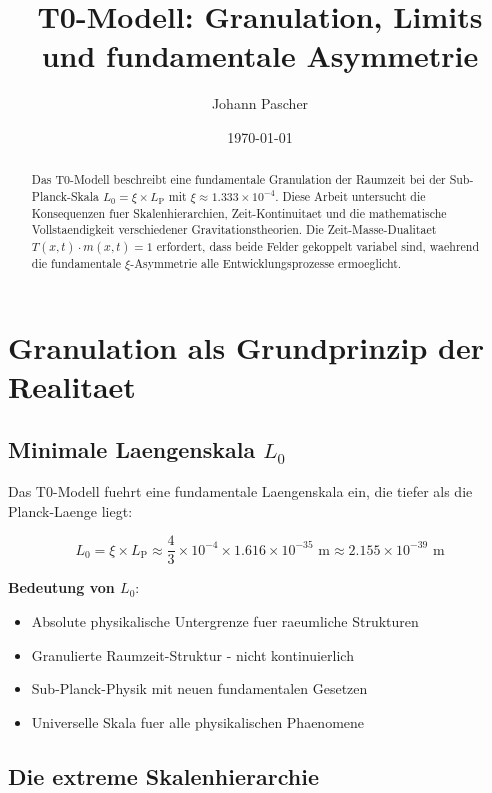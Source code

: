 \documentclass[12pt,a4paper]{article}
\title{T0-Modell: Granulation, Limits und fundamentale Asymmetrie}
\author{Johann Pascher}
\date{\today}
\newcommand{\xipar}{\xi}
\newcommand{\Lzero}{L_0}
\newcommand{\Lp}{L_{\text{P}}}
\theoremstyle{definition}
\theoremstyle{remark}
\begin{document}
	
	\maketitle
	
	\begin{abstract}
		Das T0-Modell beschreibt eine fundamentale Granulation der Raumzeit bei der Sub-Planck-Skala $\Lzero = \xipar \times \Lp$ mit $\xipar \approx 1.333 \times 10^{-4}$. Diese Arbeit untersucht die Konsequenzen fuer Skalenhierarchien, Zeit-Kontinuitaet und die mathematische Vollstaendigkeit verschiedener Gravitationstheorien. Die Zeit-Masse-Dualitaet $T(x,t) \cdot m(x,t) = 1$ erfordert, dass beide Felder gekoppelt variabel sind, waehrend die fundamentale $\xipar$-Asymmetrie alle Entwicklungsprozesse ermoeglicht.
	\end{abstract}
	
	\tableofcontents
	\newpage
	
	\section{Granulation als Grundprinzip der Realitaet}
	
	\subsection{Minimale Laengenskala $\Lzero$}
	
	Das T0-Modell fuehrt eine fundamentale Laengenskala ein, die tiefer als die Planck-Laenge liegt:
	
	\begin{equation}
		\Lzero = \xipar \times \Lp \approx \frac{4}{3} \times 10^{-4} \times 1.616 \times 10^{-35} \text{ m} \approx 2.155 \times 10^{-39} \text{ m}
	\end{equation}
	
	\textbf{Bedeutung von $\Lzero$}:
	\begin{itemize}
		\item Absolute physikalische Untergrenze fuer raeumliche Strukturen
		\item Granulierte Raumzeit-Struktur - nicht kontinuierlich
		\item Sub-Planck-Physik mit neuen fundamentalen Gesetzen
		\item Universelle Skala fuer alle physikalischen Phaenomene
	\end{itemize}
	
	\subsection{Die extreme Skalenhierarchie}
	
\end{document}
